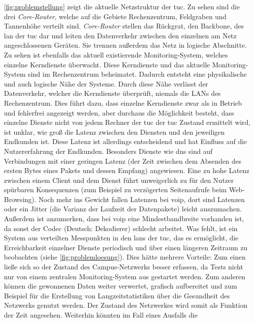 \documentclass[titlepage]{report}
\begin{document}
\autoref{fig:problemstellung} zeigt die aktuelle Netzstruktur der \gls{tuc}. Zu sehen
sind die drei \emph{Core\hyp{}Router}, welche auf die Gebiete
Rechenzentrum, Feldgraben und Tannenhöhe verteilt sind.
\emph{Core\hyp{}Router} stellen das Rückgrat, den Backbone, des
\gls{lan}
der \gls{tuc} dar und leiten den Datenverkehr zwischen den einzelnen am
Netz angeschlossenen Geräten. Sie trennen außerdem das Netz in logische
Abschnitte. Zu sehen ist ebenfalls das aktuell existierende
Monitoring\hyp{}System, welches einzelne Kerndienste überwacht. Diese
Kerndienste und das aktuelle Monitoring\hyp{}System sind im Rechenzentrum
beheimatet. Dadurch entsteht eine physikalische und auch logische Nähe
der Systeme. Durch diese Nähe verlässt der Datenverkehr, welcher die
Kerndienste überprüft, niemals die LANs des Rechenzentrum. Dies führt dazu, dass
einzelne Kerndienste zwar als in Betrieb und fehlerfrei angezeigt
werden, aber durchaus die Möglichkeit besteht, dass einzelne Dienste
nicht von jedem Rechner der \gls{tuc} der \gls{tuc}
Zustand ermittelt wird, ist unklar, wie groß die Latenz zwischen den
Diensten und den jeweiligen Endkunden ist. Diese Latenz ist allerdings
entscheidend und hat Einfluss auf die Nutzererfahrung der Endkunden.
Besonders Dienste wie \gls{dns} sind auf Verbindungen mit einer geringen
Latenz (der Zeit zwischen dem Absenden des ersten Bytes eines Pakets und
dessen Empfang) angewiesen. Eine zu hohe Latenz zwischen einem Client und dem Dienst
führt unweigerlich zu für den Nutzer spürbaren Konsequenzen (zum
Beispiel zu verzögerten Seitenaufrufe beim Web-Browsing). Noch mehr ins
Gewicht fallen Latenzen bei \gls{voip}, dort sind Latenzen oder ein
Jitter (die Varianz der Laufzeit der Datenpakete\cite{JITTERWIKI})
leicht auszumachen. Außerdem ist anzumerken, dass bei \gls{voip} eine
Mindestbandbreite vorhanden ist, da sonst der Codec (Deutsch:
Dekodierer) schlecht arbeitet. Was fehlt, ist ein System aus verteilten
Messpunkten in den \glspl{lan} der \gls{tuc},
das es ermöglicht, die Erreichbarkeit einzelner Dienste periodisch und
über einen längeren Zeitraum zu beobachten (siehe \autoref{fig:problemloesung}). Dies
hätte mehrere Vorteile: Zum einen ließe sich so der Zustand des
Campus-Netzwerks besser erfassen, da Tests nicht nur von einem zentralen
Monitoring\hyp{}System aus gestartet werden. Zum anderen können die
gewonnenen Daten weiter verwertet, grafisch aufbereitet und zum Beispiel
für die Erstellung von Langzeitstatistiken über die Gesundheit des
Netzwerks genutzt werden. Der Zustand des Netzwerkes wird somit als
Funktion der Zeit angesehen. Weiterhin könnten im Fall eines Ausfalls die
\end{document}
